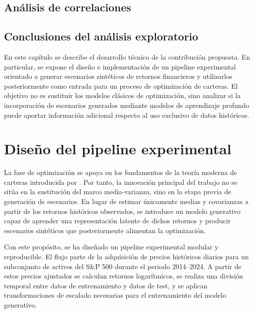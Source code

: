 \subsection{Análisis de correlaciones}

\subsection{Conclusiones del análisis exploratorio}

En este capítulo se describe el desarrollo técnico de la contribución propuesta. En particular, se expone el diseño e implementación de un pipeline experimental orientado a generar escenarios sintéticos de retornos financieros y utilizarlos posteriormente como entrada para un proceso de optimización de carteras. El objetivo no es sustituir los modelos clásicos de optimización, sino analizar si la incorporación de escenarios generados mediante modelos de aprendizaje profundo puede aportar información adicional respecto al uso exclusivo de datos históricos.

\section{Diseño del pipeline experimental}

La fase de optimización se apoya en los fundamentos de la teoría moderna de carteras introducida por \cite{markowitz1952}. Por tanto, la innovación principal del trabajo no se sitúa en la sustitución del marco media-varianza, sino en la etapa previa de generación de escenarios. En lugar de estimar únicamente medias y covarianzas a partir de los retornos históricos observados, se introduce un modelo generativo capaz de aprender una representación latente de dichos retornos y producir escenarios sintéticos que posteriormente alimentan la optimización.

Con este propósito, se ha diseñado un pipeline experimental modular y reproducible. El flujo parte de la adquisición de precios históricos diarios para un subconjunto de activos del S\&P 500 durante el periodo 2014--2024. A partir de estos precios ajustados se calculan retornos logarítmicos, se realiza una división temporal entre datos de entrenamiento y datos de test, y se aplican transformaciones de escalado necesarias para el entrenamiento del modelo generativo.

